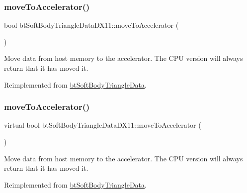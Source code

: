 \subsubsection{\texorpdfstring{move\+To\+Accelerator()}{moveToAccelerator()}\hspace{0.1cm}{\footnotesize\ttfamily [1/2]}}
{\footnotesize\ttfamily bool bt\+Soft\+Body\+Triangle\+Data\+D\+X11\+::move\+To\+Accelerator (\begin{DoxyParamCaption}{ }\end{DoxyParamCaption})\hspace{0.3cm}{\ttfamily [virtual]}}

Move data from host memory to the accelerator. The C\+PU version will always return that it has moved it. 

Reimplemented from \hyperlink{classbtSoftBodyTriangleData_a64a1971c6c64d80cc8cd488cb11208a6}{bt\+Soft\+Body\+Triangle\+Data}.

\mbox{\label{classbtSoftBodyTriangleDataDX11_a6885a4e276703f9dd643fab1d6035586}} 
\subsubsection{\texorpdfstring{move\+To\+Accelerator()}{moveToAccelerator()}\hspace{0.1cm}{\footnotesize\ttfamily [2/2]}}
{\footnotesize\ttfamily virtual bool bt\+Soft\+Body\+Triangle\+Data\+D\+X11\+::move\+To\+Accelerator (\begin{DoxyParamCaption}{ }\end{DoxyParamCaption})\hspace{0.3cm}{\ttfamily [virtual]}}

Move data from host memory to the accelerator. The C\+PU version will always return that it has moved it. 

Reimplemented from \hyperlink{classbtSoftBodyTriangleData_a64a1971c6c64d80cc8cd488cb11208a6}{bt\+Soft\+Body\+Triangle\+Data}.

\mbox{\label{classbtSoftBodyTriangleDataDX11_a337ba5c2142ee9571a6cce7871a59a37}} 
